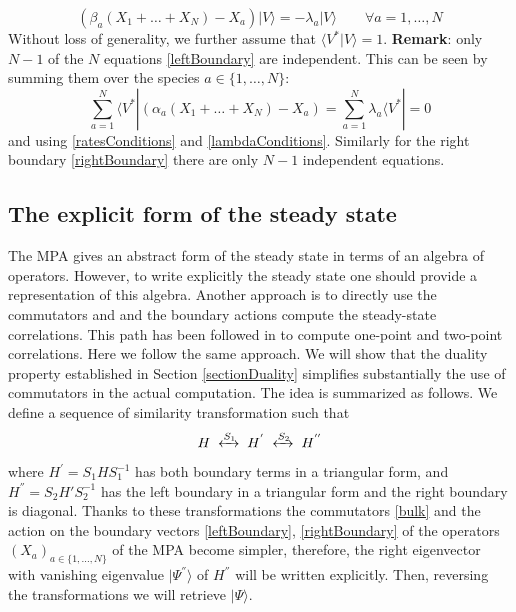 \documentclass[10pt]{article}
\numberwithin{equation}{section}
\numberwithin{equation}{subsection}
\begin{document}
\begin{equation}\label{rightBoundary}
	\left(\beta_{a}(X_{1}+\ldots+X_{N})-X_{a}\right)|V\rangle=-\lambda_{a}|V\rangle\qquad\forall a=1,\ldots,N
\end{equation}
Without loss of generality, we further assume that $\langle V^{*}|V\rangle=1$. 
\newline \newline
\textbf{Remark}: only $N-1$ of the $N$ equations \eqref{leftBoundary}  are independent. This can be seen by summing them over the species $a\in \{1,\ldots,N\}$:
	\begin{equation}
		\sum_{a=1}^{N}	\langle V^{*}|\left(\alpha_{a}(X_{1}+\ldots+X_{N})-X_{a}\right)=\sum_{a=1}^{N}\lambda_{a}\langle V^{*}|=0
	\end{equation}
	and using  \eqref{ratesConditions} and \eqref{lambdaConditions}.
 Similarly for the right boundary  \eqref{rightBoundary} there are only  $N-1$ independent equations.
\subsection{The explicit form of the steady state}\label{subsection-exact}
The MPA gives an abstract form of the steady state in terms of an algebra of operators. However, to write explicitly the steady state one should provide a representation of this algebra. Another approach is to directly use the commutators and and the boundary actions compute the steady-state correlations. This path has been followed in \cite{vanicat2017exact} to compute one-point and two-point correlations. 
Here we follow the same approach. We will show that the duality property established in Section \ref{sectionDuality} simplifies substantially the  use of commutators in the actual
computation. The idea is summarized as follows. We define a sequence of similarity transformation such that 
\begin{equation}
	H\;\xleftrightarrow{S_{1}}\;H^{'}\;\xleftrightarrow{S_{2}}\;H^{''}
\end{equation} 
where $H^{'}= S_{1} H S_{1}^{-1} $ has both boundary terms in a triangular form, and $H^{''} = S_{2}H' S_{2}^{-1}$ has the left boundary in a triangular form and the right boundary is diagonal. Thanks to these transformations the commutators \eqref{bulk} and the action on the boundary vectors \eqref{leftBoundary}, \eqref{rightBoundary} of the operators $(X_{a})_{a\in\{1,\ldots,N\}}$ of the MPA become simpler, therefore, the right eigenvector with vanishing eigenvalue $|\Psi^{''}\rangle$ of $H^{''}$ will be written explicitly. Then, reversing the transformations we will retrieve $|\Psi\rangle$.
\end{document}
